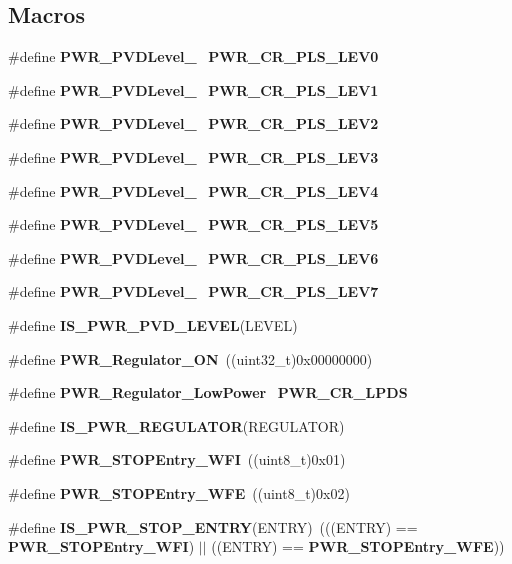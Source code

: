 \subsection*{Macros}
\begin{DoxyCompactItemize}
\item 
\#define \textbf{ P\+W\+R\+\_\+\+P\+V\+D\+Level\+\_}~\textbf{ P\+W\+R\+\_\+\+C\+R\+\_\+\+P\+L\+S\+\_\+\+L\+E\+V0}
\item 
\#define \textbf{ P\+W\+R\+\_\+\+P\+V\+D\+Level\+\_}~\textbf{ P\+W\+R\+\_\+\+C\+R\+\_\+\+P\+L\+S\+\_\+\+L\+E\+V1}
\item 
\#define \textbf{ P\+W\+R\+\_\+\+P\+V\+D\+Level\+\_}~\textbf{ P\+W\+R\+\_\+\+C\+R\+\_\+\+P\+L\+S\+\_\+\+L\+E\+V2}
\item 
\#define \textbf{ P\+W\+R\+\_\+\+P\+V\+D\+Level\+\_}~\textbf{ P\+W\+R\+\_\+\+C\+R\+\_\+\+P\+L\+S\+\_\+\+L\+E\+V3}
\item 
\#define \textbf{ P\+W\+R\+\_\+\+P\+V\+D\+Level\+\_}~\textbf{ P\+W\+R\+\_\+\+C\+R\+\_\+\+P\+L\+S\+\_\+\+L\+E\+V4}
\item 
\#define \textbf{ P\+W\+R\+\_\+\+P\+V\+D\+Level\+\_}~\textbf{ P\+W\+R\+\_\+\+C\+R\+\_\+\+P\+L\+S\+\_\+\+L\+E\+V5}
\item 
\#define \textbf{ P\+W\+R\+\_\+\+P\+V\+D\+Level\+\_}~\textbf{ P\+W\+R\+\_\+\+C\+R\+\_\+\+P\+L\+S\+\_\+\+L\+E\+V6}
\item 
\#define \textbf{ P\+W\+R\+\_\+\+P\+V\+D\+Level\+\_}~\textbf{ P\+W\+R\+\_\+\+C\+R\+\_\+\+P\+L\+S\+\_\+\+L\+E\+V7}
\item 
\#define \textbf{ I\+S\+\_\+\+P\+W\+R\+\_\+\+P\+V\+D\+\_\+\+L\+E\+V\+EL}(L\+E\+V\+EL)
\item 
\#define \textbf{ P\+W\+R\+\_\+\+Regulator\+\_\+\+ON}~((uint32\+\_\+t)0x00000000)
\item 
\#define \textbf{ P\+W\+R\+\_\+\+Regulator\+\_\+\+Low\+Power}~\textbf{ P\+W\+R\+\_\+\+C\+R\+\_\+\+L\+P\+DS}
\item 
\#define \textbf{ I\+S\+\_\+\+P\+W\+R\+\_\+\+R\+E\+G\+U\+L\+A\+T\+OR}(R\+E\+G\+U\+L\+A\+T\+OR)
\item 
\#define \textbf{ P\+W\+R\+\_\+\+S\+T\+O\+P\+Entry\+\_\+\+W\+FI}~((uint8\+\_\+t)0x01)
\item 
\#define \textbf{ P\+W\+R\+\_\+\+S\+T\+O\+P\+Entry\+\_\+\+W\+FE}~((uint8\+\_\+t)0x02)
\item 
\#define \textbf{ I\+S\+\_\+\+P\+W\+R\+\_\+\+S\+T\+O\+P\+\_\+\+E\+N\+T\+RY}(E\+N\+T\+RY)~(((E\+N\+T\+RY) == \textbf{ P\+W\+R\+\_\+\+S\+T\+O\+P\+Entry\+\_\+\+W\+FI}) $\vert$$\vert$ ((E\+N\+T\+RY) == \textbf{ P\+W\+R\+\_\+\+S\+T\+O\+P\+Entry\+\_\+\+W\+FE}))
$$
\end{DoxyCompactItemize}
